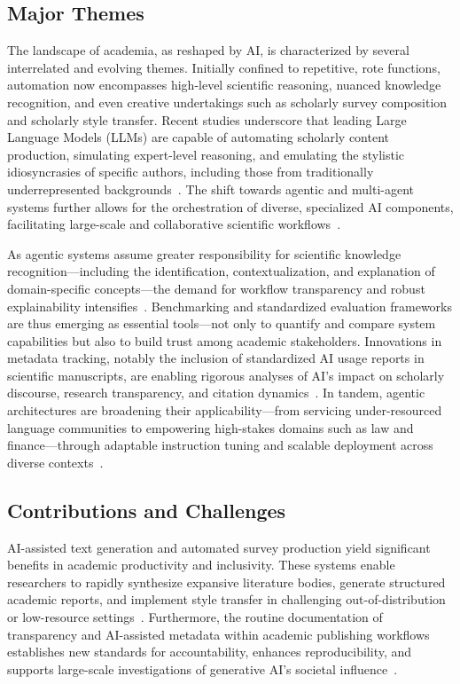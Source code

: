 \subsection{Major Themes}

The landscape of academia, as reshaped by AI, is characterized by several interrelated and evolving themes. Initially confined to repetitive, rote functions, automation now encompasses high-level scientific reasoning, nuanced knowledge recognition, and even creative undertakings such as scholarly survey composition and scholarly style transfer. Recent studies underscore that leading Large Language Models (LLMs) are capable of automating scholarly content production, simulating expert-level reasoning, and emulating the stylistic idiosyncrasies of specific authors, including those from traditionally underrepresented backgrounds~\cite{ref102,ref104}. The shift towards agentic and multi-agent systems further allows for the orchestration of diverse, specialized AI components, facilitating large-scale and collaborative scientific workflows~\cite{ref16,ref106}.

As agentic systems assume greater responsibility for scientific knowledge recognition—including the identification, contextualization, and explanation of domain-specific concepts—the demand for workflow transparency and robust explainability intensifies~\cite{ref106}. Benchmarking and standardized evaluation frameworks are thus emerging as essential tools—not only to quantify and compare system capabilities but also to build trust among academic stakeholders. Innovations in metadata tracking, notably the inclusion of standardized AI usage reports in scientific manuscripts, are enabling rigorous analyses of AI’s impact on scholarly discourse, research transparency, and citation dynamics~\cite{ref101,ref105}. In tandem, agentic architectures are broadening their applicability—from servicing under-resourced language communities to empowering high-stakes domains such as law and finance—through adaptable instruction tuning and scalable deployment across diverse contexts~\cite{ref103,ref104,ref105,ref106,ref111}.

\subsection{Contributions and Challenges}

AI-assisted text generation and automated survey production yield significant benefits in academic productivity and inclusivity. These systems enable researchers to rapidly synthesize expansive literature bodies, generate structured academic reports, and implement style transfer in challenging out-of-distribution or low-resource settings~\cite{ref104,ref105,ref106}. Furthermore, the routine documentation of transparency and AI-assisted metadata within academic publishing workflows establishes new standards for accountability, enhances reproducibility, and supports large-scale investigations of generative AI’s societal influence~\cite{ref101,ref105}.

